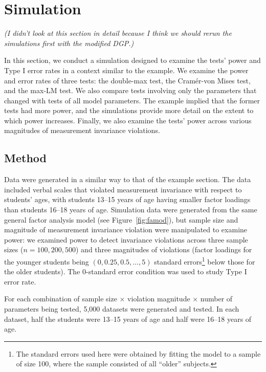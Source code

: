 \documentclass[man]{apa}
\newcommand{\readme}[1]{\emph{\marginpar{README} (#1)}}
\begin{document}
\section{Simulation}

\readme{I didn't look at this section in detail because I think we
should rerun the simulations first with the modified DGP.}

In this section, we conduct a simulation designed to
examine the tests' power and Type I error rates in a context
similar to the example.
We examine the power and error rates of three tests: the double-max test, the
Cram\'{e}r-von Mises test, and the max-LM test.  We also compare 
tests involving only the parameters that changed with tests of all model
parameters.  The example implied that the former tests had more
power, and the simulations provide more detail on the extent to which
power increases.  Finally, we also examine the tests' power across
various magnitudes of measurement invariance violations.

\subsection{Method}
Data were generated in a similar way to that of 
the example section.
The data included verbal scales that violated measurement invariance
with respect to students' ages, with students 13--15 years of age
having smaller factor loadings than students 16--18 years of age.  
Simulation data were generated from the same general factor analysis
model (see Figure~\ref{fig:famod}), but sample size and magnitude
of measurement 
invariance violation were manipulated to examine power:
we examined power to detect 
invariance violations across three sample sizes ($n=100,
200, 500$) and three magnitudes of violations (factor loadings
for the younger students being $(0, 0.25, 0.5, \dots, 5)$ standard
errors\footnote{The standard errors used here were
  obtained by fitting
  the model to a sample of size 100, where the sample consisted of all
  ``older'' subjects.} below 
those for the older students).  The 0-standard error condition was
used to study Type I error rate.

For each combination of sample size $\times$
violation magnitude $\times$ number of parameters being tested,
5,000 datasets were generated and tested.  In each dataset, half the
students were 13--15 
years of age and half were 16--18 years of age.
\end{document}
